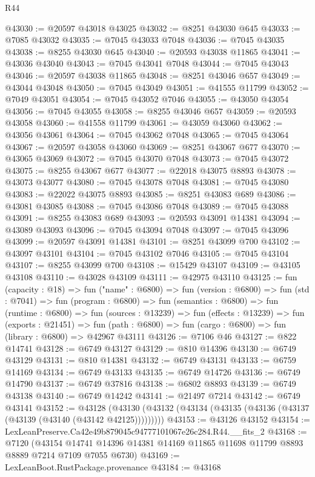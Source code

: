 \begin{lexlean}{R44}
\begin{coremodule}
{@43030 := @20597 @43018 @43025
@43032 := @8251 @43030 @645
@43033 := @7085 @43032
@43035 := @7045 @43033 @7048
@43036 := @7045 @43035
@43038 := @8255 @43030 @645
@43040 := @20593 @43038 @11865
@43041 := @43036 @43040
@43043 := @7045 @43041 @7048
@43044 := @7045 @43043
@43046 := @20597 @43038 @11865
@43048 := @8251 @43046 @657
@43049 := @43044 @43048
@43050 := @7045 @43049
@43051 := @41555 @11799
@43052 := @7049 @43051
@43054 := @7045 @43052 @7046
@43055 := @43050 @43054
@43056 := @7045 @43055
@43058 := @8255 @43046 @657
@43059 := @20593 @43058
@43060 := @41558 @11799
@43061 := @43059 @43060
@43062 := @43056 @43061
@43064 := @7045 @43062 @7048
@43065 := @7045 @43064
@43067 := @20597 @43058 @43060
@43069 := @8251 @43067 @677
@43070 := @43065 @43069
@43072 := @7045 @43070 @7048
@43073 := @7045 @43072
@43075 := @8255 @43067 @677
@43077 := @22018 @43075 @8893
@43078 := @43073 @43077
@43080 := @7045 @43078 @7048
@43081 := @7045 @43080
@43083 := @22022 @43075 @8893
@43085 := @8251 @43083 @689
@43086 := @43081 @43085
@43088 := @7045 @43086 @7048
@43089 := @7045 @43088
@43091 := @8255 @43083 @689
@43093 := @20593 @43091 @14381
@43094 := @43089 @43093
@43096 := @7045 @43094 @7048
@43097 := @7045 @43096
@43099 := @20597 @43091 @14381
@43101 := @8251 @43099 @700
@43102 := @43097 @43101
@43104 := @7045 @43102 @7046
@43105 := @7045 @43104
@43107 := @8255 @43099 @700
@43108 := @15429 @43107
@43109 := @43105 @43108
@43110 := @43028 @43109
@43111 := @42975 @43110
@43125 := fun (capacity : @18) =>
  fun ("name" : @6800) =>
  fun (version : @6800) =>
  fun (std : @7041) =>
  fun (program : @6800) =>
  fun (semantics : @6800) =>
  fun (runtime : @6800) =>
  fun (sources : @13239) =>
  fun (effects : @13239) =>
  fun (exports : @21451) =>
  fun (path : @6800) => fun (cargo : @6800) => fun (library : @6800) => @42967 @43111
@43126 := @7106 @46
@43127 := @822 @14741
@43128 := @6749 @43127
@43129 := @810 @14396
@43130 := @6749 @43129
@43131 := @810 @14381
@43132 := @6749 @43131
@43133 := @6759 @14169
@43134 := @6749 @43133
@43135 := @6749 @14726
@43136 := @6749 @14790
@43137 := @6749 @37816
@43138 := @6802 @8893
@43139 := @6749 @43138
@43140 := @6749 @14242
@43141 := @21497 @7214
@43142 := @6749 @43141
@43152 := @43128
    (@43130 (@43132 (@43134 (@43135 (@43136 (@43137 (@43139 (@43140 (@43142 @42125)))))))))
@43153 := @43126 @43152
@43154 := LexLeanPreserve.Ca42e49b879045c94777101067e26c284.R44.__fits_2
@43168 := @7120
    (@43154 @14741 @14396 @14381 @14169 @11865 @11698 @11799 @8893 @8889 @7214 @7109 @7055 @6730)
@43169 := LexLeanBoot.RustPackage.provenance
@43184 := @43168
}
\end{coremodule}
\end{lexlean}

